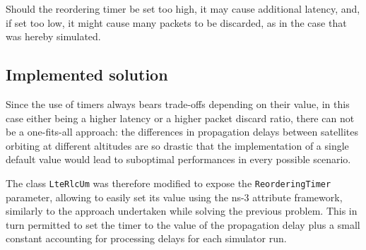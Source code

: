 Should the reordering timer be set too high, it may cause additional latency, and, if set too low, it might cause many packets to be discarded, as in the case that was hereby simulated.


\subsection{Implemented solution}
Since the use of timers always bears trade-offs depending on their value, in this case either being a higher latency or a higher packet discard ratio, there can not be a one-fits-all approach: the differences in propagation delays between satellites orbiting at different altitudes are so drastic that the implementation of a single default value would lead to suboptimal performances in every possible scenario. 

The class \texttt{LteRlcUm} was therefore modified to expose the \texttt{ReorderingTimer} parameter, allowing to easily set its value using the ns-3 attribute framework, similarly to the approach undertaken while solving the previous problem. This in turn permitted to set the timer to the value of the propagation delay plus a small constant accounting for processing delays for each simulator run.